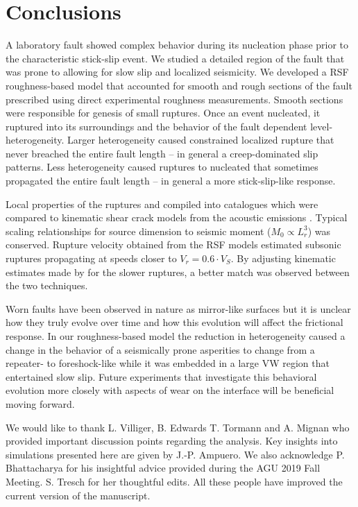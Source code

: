 \documentclass[draft]{agujournal2019}
\begin{document}
\section{Conclusions}

A laboratory fault showed complex behavior during its nucleation phase prior to the characteristic stick-slip event.  We studied a detailed region of the fault that was prone to allowing for slow slip and localized seismicity.  We developed a RSF roughness-based model that accounted for smooth and rough sections of the fault prescribed using direct experimental roughness measurements. Smooth sections were responsible for genesis of small ruptures.  Once an event nucleated, it ruptured into its surroundings and the behavior of the fault dependent level-heterogeneity.  Larger heterogeneity caused constrained localized rupture that never breached the entire fault length -- in general a creep-dominated slip patterns. Less heterogeneity caused ruptures to nucleated that sometimes propagated the entire fault length -- in general a more stick-slip-like response.  

Local properties of the ruptures and compiled into catalogues which were compared to kinematic shear crack models from the acoustic emissions \cite{Selvadurai2019}.  Typical scaling relationships for source dimension to seismic moment ($M_{0} \propto L^{3}_{r}$) was conserved.  Rupture velocity obtained from the RSF models estimated subsonic ruptures propagating at speeds closer to $V_r = 0.6\cdot V_{S}$.  By adjusting kinematic estimates made by  for the slower ruptures, a better match was observed between the two techniques.

Worn faults have been observed in nature as mirror-like surfaces but it is unclear how they truly evolve over time and how this evolution will affect the frictional response.  In our roughness-based model the reduction in heterogeneity caused a change in the behavior of a seismically prone asperities to change from a repeater- to foreshock-like while it was embedded in a large VW region that entertained slow slip.  Future experiments that investigate this behavioral evolution more closely with aspects of wear on the interface will be beneficial moving forward. 

\acknowledgments
We would like to thank L. Villiger, B. Edwards T. Tormann and A. Mignan who provided important discussion points regarding the analysis. Key insights into simulations presented here are given by J.-P. Ampuero. We also acknowledge P. Bhattacharya for his insightful advice provided during the AGU 2019 Fall Meeting.  S. Tresch for her thoughtful edits. All these people have improved the current version of the manuscript. 
\end{document}
